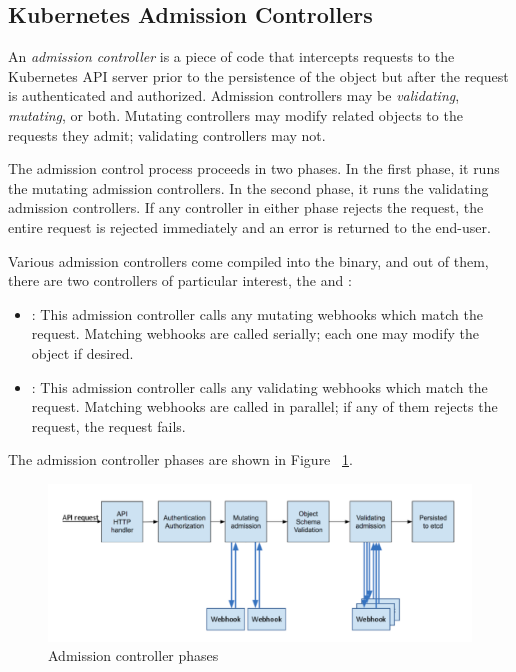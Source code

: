 \subsection{Kubernetes Admission Controllers}

An \textit{admission controller} is a piece of code that intercepts requests to
the Kubernetes API server prior to the persistence of the object but after the
request is authenticated and authorized. Admission controllers may be
\textit{validating}, \textit{mutating}, or both. Mutating controllers may modify
related objects to the requests they admit; validating controllers may not.

The admission control process proceeds in two phases. In the first phase, it
runs the mutating admission controllers. In the second phase, it runs the
validating admission controllers. If any controller in either phase rejects the
request, the entire request is rejected immediately and an error is returned to
the end-user.

Various admission controllers come compiled into the  binary,
and out of them, there are two controllers of particular interest, the
 and :
\begin{itemize}
      \tightlist
      \item {}: This admission controller calls any
            mutating webhooks which match the request. Matching webhooks are called
            serially; each one may modify the object if desired.

      \item {}: This admission controller calls any
            validating webhooks which match the request. Matching webhooks are
            called in parallel; if any of them rejects the request, the request
            fails.
\end{itemize}

The admission controller phases are shown in Figure
~\ref{figure:admission-controller}.
\begin{figure}[ht]
      \centering
      \includegraphics[width=\textwidth]{resources/admission-controller-phases.png}
      \caption{Admission controller phases}
      \label{figure:admission-controller}
\end{figure}

